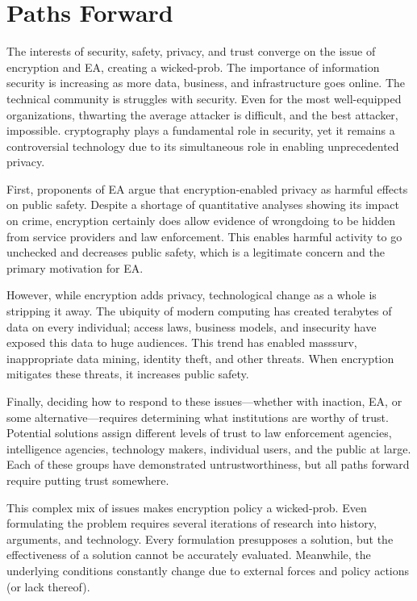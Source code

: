 \chapter{Paths Forward}
\label{chap-pathsforward}

The interests of security, safety, privacy, and trust converge on the issue of encryption and \acl{EA}, creating a
\ac{wicked-prob}. The importance of information security is increasing as more data, business, and infrastructure goes
online. The technical community is struggles with security. Even for the most well-equipped organizations, thwarting the
average attacker is difficult, and the best attacker, impossible. \Ac{cryptography} plays a fundamental role in
security, yet it remains a controversial technology due to its simultaneous role in enabling unprecedented privacy.

First, proponents of \acl{EA} argue that encryption-enabled privacy as harmful effects on public safety. Despite a
shortage of quantitative analyses showing its impact on crime, encryption certainly does allow evidence of wrongdoing to
be hidden from service providers and law enforcement. This enables harmful activity to go unchecked and decreases public
safety, which is a legitimate concern and the primary motivation for \ac{EA}.

However, while encryption adds privacy, technological change as a whole is stripping it away. The ubiquity of modern
computing has created terabytes of data on every individual; access laws, business models, and insecurity have exposed
this data to huge audiences. This trend has enabled \ac{masssurv}, inappropriate data mining, identity theft, and other
threats. When encryption mitigates these threats, it increases public safety.

Finally, deciding how to respond to these issues---whether with inaction, \ac{EA}, or some alternative---requires
determining what institutions are worthy of trust. Potential solutions assign different levels of trust to law
enforcement agencies, intelligence agencies, technology makers, individual users, and the public at large. Each of these
groups have demonstrated untrustworthiness, but all paths forward require putting trust somewhere.

This complex mix of issues makes encryption policy a \ac{wicked-prob}. Even formulating the problem requires several
iterations of research into history, arguments, and technology. Every formulation presupposes a solution, but the
effectiveness of a solution cannot be accurately evaluated. Meanwhile, the underlying conditions constantly change due
to external forces and policy actions (or lack thereof).

